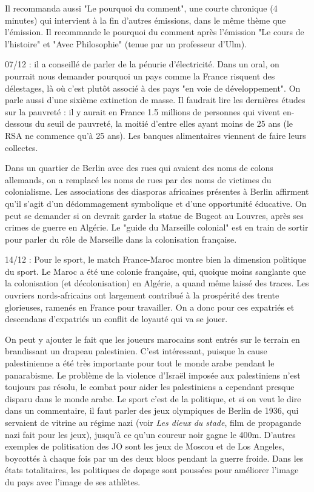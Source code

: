 \documentclass[a4paper,12pt]{book}
\begin{document}
\par Il recommanda aussi "Le pourquoi du comment", une courte chronique (4 minutes) qui intervient à la fin d'autres émissions, dans le même thème que l'émission. Il recommande le pourquoi du comment après l'émission "Le cours de l'histoire" et "Avec Philosophie" (tenue par un professeur d'Ulm).
\par 07/12 : il a conseillé de parler de la pénurie d'électricité. Dans un oral, on pourrait nous demander pourquoi un pays comme la France risquent des délestages, là où c'est plutôt associé à des pays "en voie de développement". On parle aussi d'une sixième extinction de masse. Il faudrait lire les dernières études sur la pauvreté : il y aurait en France 1.5 millions de personnes qui vivent en-dessous du seuil de pauvreté, la moitié d'entre elles ayant moins de 25 ans (le RSA ne commence qu'à 25 ans). Les banques alimentaires viennent de faire leurs collectes.
\par Dans un quartier de Berlin avec des rues qui avaient des noms de colons allemands, on a remplacé les noms de rues par des noms de victimes du colonialisme. Les associations des diasporas africaines présentes à Berlin affirment qu'il s'agit d'un dédommagement symbolique et d'une opportunité éducative. On peut se demander si on devrait garder la statue de Bugeot au Louvres, après ses crimes de guerre en Algérie. Le "guide du Marseille colonial" est en train de sortir pour parler du rôle de Marseille dans la colonisation française.
\par 14/12 : Pour le sport, le match France-Maroc montre bien la dimension politique du sport. Le Maroc a été une colonie française, qui, quoique moins sanglante que la colonisation (et décolonisation) en Algérie, a quand même laissé des traces. Les ouvriers nords-africains ont largement contribué à la prospérité des trente glorieuses, ramenés en France pour travailler. On a donc pour ces expatriés et descendans d'expatriés un conflit de loyauté qui va se jouer.
\par On peut y ajouter le fait que les joueurs marocains sont entrés sur le terrain en brandissant un drapeau palestinien. C'est intéressant, puisque la cause palestinienne a été très importante pour tout le monde arabe pendant le panarabisme. Le problème de la violence d'Israël imposée aux palestiniens n'est toujours pas résolu, le combat pour aider les palestiniens a cependant presque disparu dans le monde arabe. Le sport c'est de la politique, et si on veut le dire dans un commentaire, il faut parler des jeux olympiques de Berlin de 1936, qui servaient de vitrine au régime nazi (voir \textit{Les dieux du stade}, film de propagande nazi fait pour les jeux), jusqu'à ce qu'un coureur noir gagne le 400m. D'autres exemples de politisation des JO sont les jeux de Moscou et de Los Angeles, boycottés à chaque fois par un des deux blocs pendant la guerre froide. Dans les états totalitaires, les politiques de dopage sont poussées pour améliorer l'image du pays avec l'image de ses athlètes.
\end{document}
